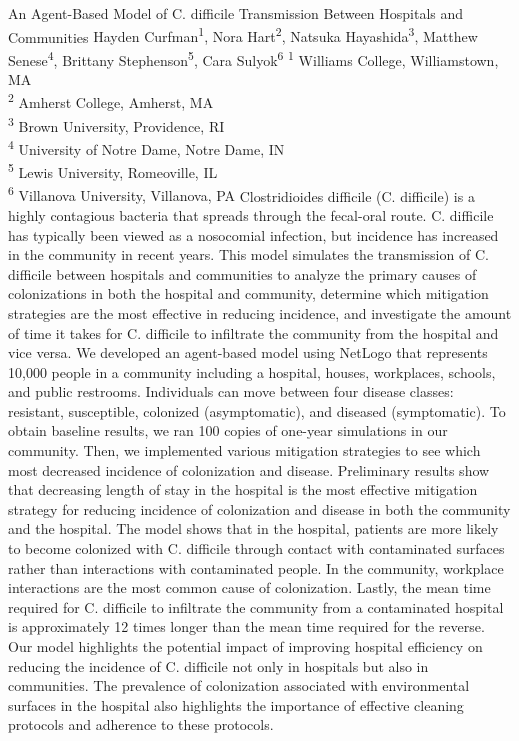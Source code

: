 \makeabstract
    {
    An Agent-Based Model of C. difficile Transmission Between Hospitals and Communities
    }
    {
    Hayden Curfman\textsuperscript{1}, Nora Hart\textsuperscript{2}, Natsuka Hayashida\textsuperscript{3}, Matthew Senese\textsuperscript{4}, Brittany Stephenson\textsuperscript{5}, Cara Sulyok\textsuperscript{6}
    }
    {
    \textsuperscript{1} Williams College, Williamstown, MA\\
\textsuperscript{2} Amherst College, Amherst, MA\\
\textsuperscript{3} Brown University, Providence, RI\\
\textsuperscript{4} University of Notre Dame, Notre Dame, IN\\
\textsuperscript{5} Lewis University, Romeoville, IL\\
\textsuperscript{6} Villanova University, Villanova, PA
    }
    {
    Clostridioides difficile (C. difficile) is a highly contagious bacteria that spreads through the fecal-oral route. C. difficile has typically been viewed as a nosocomial infection, but incidence has increased in the community in recent years. This model simulates the transmission of C. difficile between hospitals and communities to analyze the primary causes of colonizations in both the hospital and community, determine which mitigation strategies are the most effective in reducing incidence, and investigate the amount of time it takes for C. difficile to infiltrate the community from the hospital and vice versa.
    }
    {
    We developed an agent-based model using NetLogo that represents 10,000 people in a community including a hospital, houses, workplaces, schools, and public restrooms. Individuals can move between four disease classes: resistant, susceptible, colonized (asymptomatic), and diseased (symptomatic). To obtain baseline results, we ran 100 copies of one-year simulations in our community. Then, we implemented various mitigation strategies to see which most decreased incidence of colonization and disease.
    }
    {
    Preliminary results show that decreasing length of stay in the hospital is the most effective mitigation strategy for reducing incidence of colonization and disease in both the community and the hospital. The model shows that in the hospital, patients are more likely to become colonized with C. difficile through contact with contaminated surfaces rather than interactions with contaminated people. In the community, workplace interactions are the most common cause of colonization. Lastly, the mean time required for C. difficile to infiltrate the community from a contaminated hospital is approximately 12 times longer than the mean time required for the reverse.
    }
    {
    Our model highlights the potential impact of improving hospital efficiency on reducing the incidence of C. difficile not only in hospitals but also in communities. The prevalence of colonization associated with environmental surfaces in the hospital also highlights the importance of effective cleaning protocols and adherence to these protocols.
    }

    \newpage
    